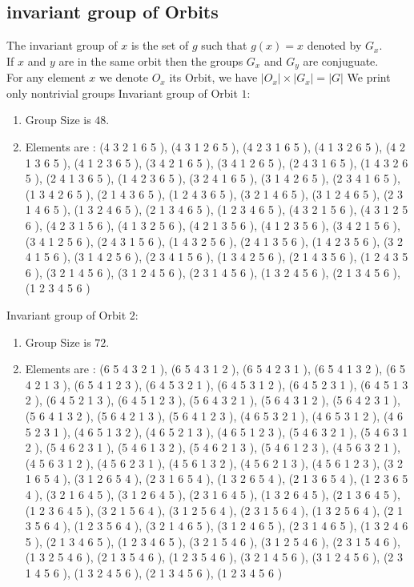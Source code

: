 \documentclass[12pt]{article}
\begin{document}
\subsection{invariant group of Orbits}
\noindent The invariant group of $x$ is the set of $g$ such that $g(x)=x$ denoted by $G_x$.\\
If $x$ and $y$ are in the same orbit then the groups $G_x$ and  $G_y$ are conjuguate.\\
For any element $x$ we denote $O_x$ its Orbit, we have $|O_x|\times |G_x|=|G|$
We print only nontrivial groups
Invariant group of Orbit $1$:
\begin{enumerate}
\item Group Size is $48$.
\item Elements are : (4 3 2 1 6 5  ), (4 3 1 2 6 5  ), (4 2 3 1 6 5  ), (4 1 3 2 6 5  ), (4 2 1 3 6 5  ), (4 1 2 3 6 5  ), (3 4 2 1 6 5  ), (3 4 1 2 6 5  ), (2 4 3 1 6 5  ), (1 4 3 2 6 5  ), (2 4 1 3 6 5  ), (1 4 2 3 6 5  ), (3 2 4 1 6 5  ), (3 1 4 2 6 5  ), (2 3 4 1 6 5  ), (1 3 4 2 6 5  ), (2 1 4 3 6 5  ), (1 2 4 3 6 5  ), (3 2 1 4 6 5  ), (3 1 2 4 6 5  ), (2 3 1 4 6 5  ), (1 3 2 4 6 5  ), (2 1 3 4 6 5  ), (1 2 3 4 6 5  ), (4 3 2 1 5 6  ), (4 3 1 2 5 6  ), (4 2 3 1 5 6  ), (4 1 3 2 5 6  ), (4 2 1 3 5 6  ), (4 1 2 3 5 6  ), (3 4 2 1 5 6  ), (3 4 1 2 5 6  ), (2 4 3 1 5 6  ), (1 4 3 2 5 6  ), (2 4 1 3 5 6  ), (1 4 2 3 5 6  ), (3 2 4 1 5 6  ), (3 1 4 2 5 6  ), (2 3 4 1 5 6  ), (1 3 4 2 5 6  ), (2 1 4 3 5 6  ), (1 2 4 3 5 6  ), (3 2 1 4 5 6  ), (3 1 2 4 5 6  ), (2 3 1 4 5 6  ), (1 3 2 4 5 6  ), (2 1 3 4 5 6  ), (1 2 3 4 5 6  )
\end{enumerate}
Invariant group of Orbit $2$:
\begin{enumerate}
\item Group Size is $72$.
\item Elements are : (6 5 4 3 2 1  ), (6 5 4 3 1 2  ), (6 5 4 2 3 1  ), (6 5 4 1 3 2  ), (6 5 4 2 1 3  ), (6 5 4 1 2 3  ), (6 4 5 3 2 1  ), (6 4 5 3 1 2  ), (6 4 5 2 3 1  ), (6 4 5 1 3 2  ), (6 4 5 2 1 3  ), (6 4 5 1 2 3  ), (5 6 4 3 2 1  ), (5 6 4 3 1 2  ), (5 6 4 2 3 1  ), (5 6 4 1 3 2  ), (5 6 4 2 1 3  ), (5 6 4 1 2 3  ), (4 6 5 3 2 1  ), (4 6 5 3 1 2  ), (4 6 5 2 3 1  ), (4 6 5 1 3 2  ), (4 6 5 2 1 3  ), (4 6 5 1 2 3  ), (5 4 6 3 2 1  ), (5 4 6 3 1 2  ), (5 4 6 2 3 1  ), (5 4 6 1 3 2  ), (5 4 6 2 1 3  ), (5 4 6 1 2 3  ), (4 5 6 3 2 1  ), (4 5 6 3 1 2  ), (4 5 6 2 3 1  ), (4 5 6 1 3 2  ), (4 5 6 2 1 3  ), (4 5 6 1 2 3  ), (3 2 1 6 5 4  ), (3 1 2 6 5 4  ), (2 3 1 6 5 4  ), (1 3 2 6 5 4  ), (2 1 3 6 5 4  ), (1 2 3 6 5 4  ), (3 2 1 6 4 5  ), (3 1 2 6 4 5  ), (2 3 1 6 4 5  ), (1 3 2 6 4 5  ), (2 1 3 6 4 5  ), (1 2 3 6 4 5  ), (3 2 1 5 6 4  ), (3 1 2 5 6 4  ), (2 3 1 5 6 4  ), (1 3 2 5 6 4  ), (2 1 3 5 6 4  ), (1 2 3 5 6 4  ), (3 2 1 4 6 5  ), (3 1 2 4 6 5  ), (2 3 1 4 6 5  ), (1 3 2 4 6 5  ), (2 1 3 4 6 5  ), (1 2 3 4 6 5  ), (3 2 1 5 4 6  ), (3 1 2 5 4 6  ), (2 3 1 5 4 6  ), (1 3 2 5 4 6  ), (2 1 3 5 4 6  ), (1 2 3 5 4 6  ), (3 2 1 4 5 6  ), (3 1 2 4 5 6  ), (2 3 1 4 5 6  ), (1 3 2 4 5 6  ), (2 1 3 4 5 6  ), (1 2 3 4 5 6  )
\end{enumerate}
\end{document}

